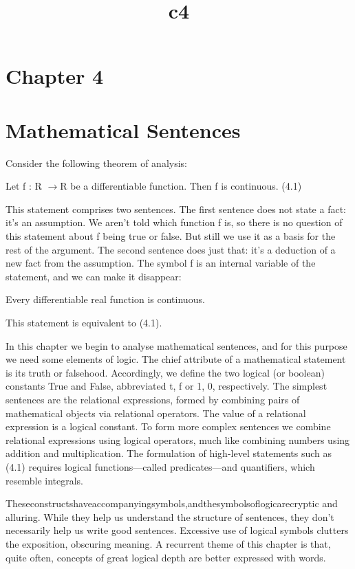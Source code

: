\documentclass[11pt]{article}
\title{c4}
\date{}
\theoremstyle{plain}
\theoremstyle{definition}
\begin{document}
\maketitle

\section{Chapter 4}

\section{Mathematical Sentences}

Consider the following theorem of analysis:

Let f : R $\to$R be a differentiable function. Then f is continuous. (4.1)

This statement comprises two sentences. The first sentence does not state a fact: it's an assumption. We aren't told which function f is, so there is no question of this statement about f being true or false. But still we use it as a basis for the rest of the argument. The second sentence does just that: it's a deduction of a new fact from the assumption. The symbol f is an internal variable of the statement, and we can make it disappear:

Every differentiable real function is continuous.

This statement is equivalent to (4.1).

In this chapter we begin to analyse mathematical sentences, and for this purpose we need some elements of logic. The chief attribute of a mathematical statement is its truth or falsehood. Accordingly, we define the two logical (or boolean) constants True and False, abbreviated t, f or 1, 0, respectively. The simplest sentences are the relational expressions, formed by combining pairs of mathematical objects via relational operators. The value of a relational expression is a logical constant. To form more complex sentences we combine relational expressions using logical operators, much like combining numbers using addition and multiplication. The formulation of high-level statements such as (4.1) requires logical functions---called predicates---and quantifiers, which resemble integrals.

Theseconstructshaveaccompanyingsymbols,andthesymbolsoflogicarecryptic and alluring. While they help us understand the structure of sentences, they don't necessarily help us write good sentences. Excessive use of logical symbols clutters the exposition, obscuring meaning. A recurrent theme of this chapter is that, quite often, concepts of great logical depth are better expressed with words.
\end{document}
